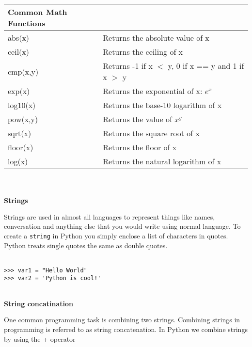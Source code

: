 \documentclass[letterpaper,11pt]{article}
\begin{document}
\begin{tabular}[t]{l l}
    \textbf{Common Math Functions} &                               \\
    \hline
    abs(x)   & Returns the absolute value of x                     \\
    ceil(x)  & Returns the ceiling of x                            \\
    cmp(x,y) & Returns -1 if x $<$ y, 0 if x == y and 1 if x $>$ y \\
    exp(x)   & Returns the exponential of x: $e^x$                 \\
    log10(x) & Returns the base-10 logarithm of x                  \\
    pow(x,y) & Returns the value of $x^y$                          \\
    sqrt(x)  & Returns the square root of x                        \\
    floor(x) & Returns the floor of x                              \\
    log(x)   & Returns the natural logarithm of x                  \\
\end{tabular}
\\ \\
\textbf{Strings}
\par{Strings are used in almost all languages to represent things like names,
conversation and anything else that you would write using normal language. To
create a \texttt{string} in Python you simply enclose a list of characters in
quotes. Python treats single quotes the same as double quotes.}
\\ \\
\begin{minipage}{.5\textwidth}
    \begin{tcolorbox}
        \begin{footnotesize}
            \begin{verbatim}
>>> var1 = "Hello World"
>>> var2 = 'Python is cool!'
            \end{verbatim}
        \end{footnotesize}
    \end{tcolorbox}
\end{minipage}
\\
\textbf{String concatination}
\par{One common programming task is combining two strings. Combining strings in
    programming is referred to as string concatenation. In Python we combine
strings by using the + operator}
\end{document}

